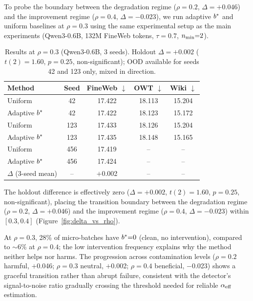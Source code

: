 To probe the boundary between the degradation regime ($\rho{=}0.2$, $\Delta{=}{+}0.046$) and the improvement regime ($\rho{=}0.4$, $\Delta{=}{-}0.023$), we run adaptive $b^*$ and uniform baselines at $\rho{=}0.3$ using the same experimental setup as the main experiments (Qwen3-0.6B, 132M FineWeb tokens, $\tau{=}0.7$, $n_{\min}{=}2$).

\begin{table}[h]
\centering
\small
\begin{tabular}{@{}lcccc@{}}
\toprule
\textbf{Method} & \textbf{Seed} & \textbf{FineWeb} $\downarrow$ & \textbf{OWT} $\downarrow$ & \textbf{Wiki} $\downarrow$ \\
\midrule
Uniform          & 42  & 17.422 & 18.113 & 15.204 \\
Adaptive $b^*$ & 42  & 17.422 & 18.123 & 15.172 \\
\midrule
Uniform          & 123 & 17.433 & 18.126 & 15.204 \\
Adaptive $b^*$ & 123 & 17.435 & 18.148 & 15.165 \\
\midrule
Uniform          & 456 & 17.419 & -- & -- \\
Adaptive $b^*$ & 456 & 17.424 & -- & -- \\
\midrule
$\Delta$ (3-seed mean) & --  & $+$0.002 & -- & -- \\
\bottomrule
\end{tabular}
\caption{Results at $\rho{=}0.3$ (Qwen3-0.6B, 3 seeds).
Holdout $\Delta{=}{+}0.002$ ($t(2){=}1.60$, $p{=}0.25$, non-significant); OOD available for seeds 42 and 123 only, mixed in direction.}
\label{tab:rho03}
\end{table}

The holdout difference is effectively zero ($\Delta{=}{+}0.002$, $t(2){=}1.60$, $p{=}0.25$, non-significant), placing the transition boundary between the degradation regime ($\rho{=}0.2$, $\Delta{=}{+}0.046$) and the improvement regime ($\rho{=}0.4$, $\Delta{=}{-}0.023$) within $[0.3, 0.4]$ (Figure~\ref{fig:delta_vs_rho}).

At $\rho{=}0.3$, 28\% of micro-batches have $b^*{=}0$ (clean, no intervention), compared to ${\sim}$6\% at $\rho{=}0.4$; the low intervention frequency explains why the method neither helps nor harms.
The progression across contamination levels ($\rho{=}0.2$ harmful, $+$0.046; $\rho{=}0.3$ neutral, $+$0.002; $\rho{=}0.4$ beneficial, $-$0.023) shows a graceful transition rather than abrupt failure, consistent with the detector's signal-to-noise ratio gradually crossing the threshold needed for reliable $\alpha_{\mathrm{eff}}$ estimation.

